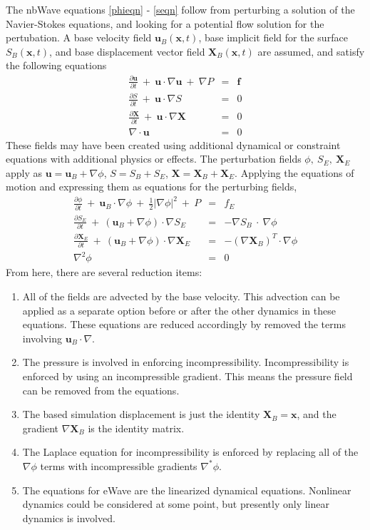 \documentclass{article}
\def\xvec{\textbf{x}}
\def\fvec{\textbf{f}}
\def\uvec{\textbf{u}}
\def\Xvec{\textbf{X}}
\def\inabla{\nabla^{*}}
\begin{document}
The nbWave equations \ref{phieqn} - \ref{seqn} follow from perturbing a solution of the Navier-Stokes equations, and looking for a potential flow solution for the pertubation.  A base velocity field $\uvec_B(\xvec,t)$, base implicit field for the surface $S_B(\xvec,t)$, and base displacement vector field $\Xvec_B(\xvec,t)$ are assumed, and satisfy the following equations
\begin{eqnarray}
\frac{\partial \uvec}{\partial t}\ +\ \uvec\cdot\nabla\uvec \ +\ \nabla P &=& \fvec \\
\frac{\partial S}{\partial t}\ +\ \uvec\cdot\nabla S &=& 0 \\
\frac{\partial \Xvec}{\partial t}\ +\ \uvec\cdot\nabla\Xvec &=& 0 \\
\nabla\cdot\uvec &=& 0
\end{eqnarray}
These fields may have been created using additional dynamical or constraint equations with additional physics or effects.  The perturbation fields $\phi,\ S_E,\ \Xvec_E$ apply as $\uvec = \uvec_B + \nabla\phi$, $S = S_B + S_E$, $\Xvec = \Xvec_B + \Xvec_E$.  Applying the equations of motion and expressing them as equations for the perturbing fields, 
\begin{eqnarray}
\frac{\partial \phi}{\partial t}\ +\ \uvec_B\cdot\nabla\phi\ +\ \frac{1}{2}\left| \nabla\phi \right|^2 \ +\ P &=& f_E \\
\frac{\partial S_E}{\partial t}\ +\ (\uvec_B+\nabla\phi)\cdot\nabla S_E &=& -\nabla S_B\ \cdot\ \nabla\phi \\
\frac{\partial \Xvec_E}{\partial t}\ +\ (\uvec_B+\nabla\phi)\cdot\nabla\Xvec_E &=& -(\nabla\Xvec_B)^{T}\cdot\nabla\phi \\
\nabla^2\phi &=& 0
\end{eqnarray}
From here, there are several reduction items:
\begin{enumerate}
\item All of the fields are advected by the base velocity. This advection can be applied as a separate option before or after the other dynamics in these equations. These equations are reduced accordingly by removed the terms involving $\uvec_B\cdot\nabla$.  
\item The pressure is involved in enforcing incompressibility.  Incompressibility is enforced by using an incompressible gradient.  This means the pressure field can be removed from the equations.
\item The based simulation displacement is just the identity $\Xvec_B = \xvec$, and the gradient $\nabla\Xvec_B$ is the identity matrix. 
\item The Laplace equation for incompressibility is enforced by replacing all of the $\nabla\phi$ terms with incompressible gradients $\inabla\phi$.
\item The equations for eWave are the linearized dynamical equations. Nonlinear dynamics could be considered at some point, but presently only linear dynamics is involved.  
\end{enumerate}
\end{document}
